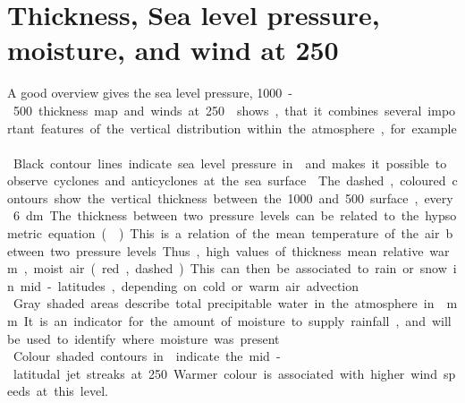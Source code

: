 \section{Thickness, Sea level pressure, moisture, and wind at \SI{250}{\hPa}}
\label{sec:Geop}
A good overview gives the sea level pressure, \SI{1000}-\SI{500}{\hPa} thickness map and winds at \SI{250}{\hPa}.  shows, that it combines several important features of the vertical distribution within the atmosphere, for example.\\
Black contour lines indicate sea level pressure in \SI{}{\hPa} and makes it possible to observe cyclones and anticyclones at the sea surface. 

\noindent The dashed, coloured contours show the vertical thickness between the \SI{1000}{\hPa} and \SI{500}{\hPa} surface, every \SI{6}{\deca\meter}. The thickness between two pressure levels can be related to the hypsometric equation (). This is a relation of the mean temperature of the air between two pressure levels. Thus, high values of thickness mean relative warm, moist air (red, dashed). This can then be associated to rain or snow in mid-latitudes, depending on cold or warm air advection.
\\
Gray shaded areas describe total precipitable water in the atmosphere in \SI{}{\mm}. It is an indicator for the amount of moisture to supply rainfall, and will be used to identify where moisture was present.
\\
Colour shaded contours in  indicate the mid-latitudal jet streaks at \SI{250}{\hPa}. Warmer colour is associated with higher wind speeds at this level.  
%


